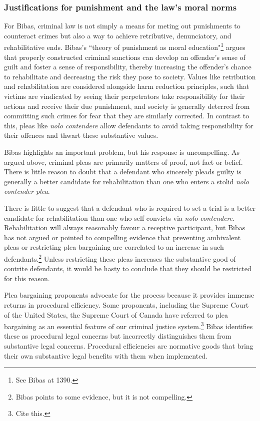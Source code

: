 \subsubsection{Justifications for punishment and the law's moral norms}

For Bibas, criminal law is not simply a means for meting out punishments to counteract crimes but also a way to achieve retributive, denunciatory, and rehabilitative ends. Bibas's ``theory of punishment as moral education"\footnote{See Bibas at 1390.} argues that properly constructed criminal sanctions can develop an offender's sense of guilt and foster a sense of responsibility, thereby increasing the offender's chance to rehabilitate and decreasing the risk they pose to society. Values like retribution and rehabilitation are considered alongside harm reduction principles, such that victims are vindicated by seeing their perpetrators take responsibility for their actions and receive their due punishment, and society is generally deterred from committing such crimes for fear that they are similarly corrected. In contrast to this, pleas like \textit{nolo contendere} allow defendants to avoid taking responsibility for their offences and thwart these substantive values.

Bibas highlights an important problem, but his response is uncompelling. As argued above, criminal pleas are primarily matters of proof, not fact or belief. There is little reason to doubt that a defendant who sincerely pleads guilty is generally a better candidate for rehabilitation than one who enters a stolid \textit{nolo contender plea}. 

There is little to suggest that a defendant who is required to set a trial is a better candidate for rehabilitation than one who self-convicts via \textit{nolo contendere}. Rehabilitation will always reasonably favour a receptive participant, but Bibas has not argued or pointed to compelling evidence that preventing ambivalent pleas or restricting plea bargaining are correlated to an increase in such defendants.\footnote{Bibas points to some evidence, but it is not compelling.} Unless restricting these pleas increases the substantive good of contrite defendants, it would be hasty to conclude that they should be restricted for this reason.

Plea bargaining proponents advocate for the process because it provides immense returns in procedural efficiency. Some proponents, including the Supreme Court of the United States, the Supreme Court of Canada have referred to plea bargaining as an essential feature of our criminal justice system.\footnote{Cite this.} Bibas identifies these as procedural legal concerns but incorrectly distinguishes them from substantive legal concerns. Procedural efficiencies are normative goods that bring their own substantive legal benefits with them when implemented. 

